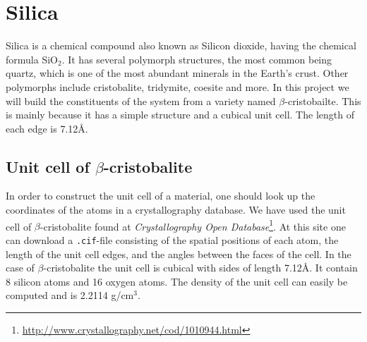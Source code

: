 \documentclass[twoside,english]{uiofysmaster}
\begin{document}
\section{Silica}
Silica is a chemical compound also known as Silicon dioxide, having the chemical formula SiO$_2$. It has several polymorph structures, the most common being quartz, which is one of the most abundant minerals in the Earth's crust. Other polymorphs include cristobalite, tridymite, coesite and more.    
In this project we will build the constituents of the system from a variety named $\beta$-cristobailte. This is mainly because it has a simple structure and a cubical unit cell. The length of each edge is 7.12Å.

\subsection{Unit cell of $\beta$-cristobalite}
In order to construct the unit cell of a material, one should look up the coordinates of the atoms in a crystallography database. We have used the unit cell of $\beta$-cristobalite found at \textit{Crystallography Open Database}\footnote{\href{http://www.crystallography.net/cod/1010944.html}{http://www.crystallography.net/cod/1010944.html}}. At this site one can download a \texttt{.cif}-file consisting of the spatial positions of each atom, the length of the unit cell edges, and the angles between the faces of the cell. In the case of $\beta$-cristobalite the unit cell is cubical with sides of length 7.12Å. It contain 8 silicon atoms and 16 oxygen atoms. The density of the unit cell can easily be computed and is 2.2114 g/cm$^3$.
\end{document}

